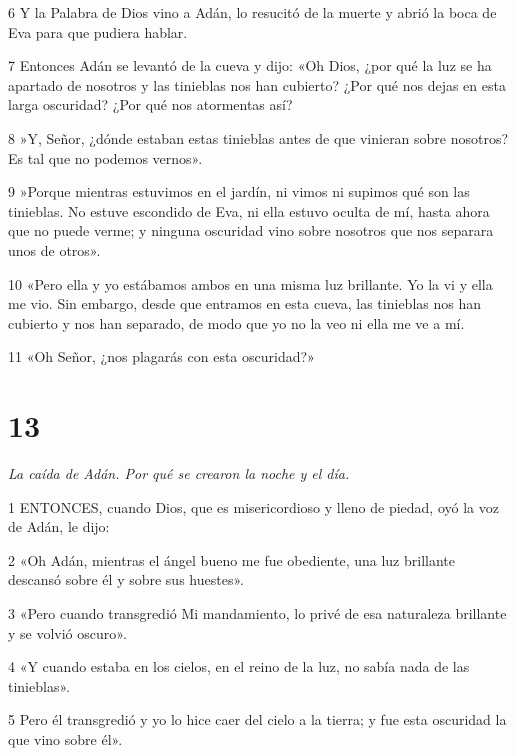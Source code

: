 \par 6 Y la Palabra de Dios vino a Adán, lo resucitó de la muerte y abrió la boca de Eva para que pudiera hablar.

\par 7 Entonces Adán se levantó de la cueva y dijo: «Oh Dios, ¿por qué la luz se ha apartado de nosotros y las tinieblas nos han cubierto? ¿Por qué nos dejas en esta larga oscuridad? ¿Por qué nos atormentas así?

\par 8 »Y, Señor, ¿dónde estaban estas tinieblas antes de que vinieran sobre nosotros? Es tal que no podemos vernos».

\par 9 »Porque mientras estuvimos en el jardín, ni vimos ni supimos qué son las tinieblas. No estuve escondido de Eva, ni ella estuvo oculta de mí, hasta ahora que no puede verme; y ninguna oscuridad vino sobre nosotros que nos separara unos de otros».

\par 10 «Pero ella y yo estábamos ambos en una misma luz brillante. Yo la vi y ella me vio. Sin embargo, desde que entramos en esta cueva, las tinieblas nos han cubierto y nos han separado, de modo que yo no la veo ni ella me ve a mí.

\par 11 «Oh Señor, ¿nos plagarás con esta oscuridad?»

\chapter{13}

\par \textit{La caída de Adán. Por qué se crearon la noche y el día.}

\par 1 ENTONCES, cuando Dios, que es misericordioso y lleno de piedad, oyó la voz de Adán, le dijo:

\par 2 «Oh Adán, mientras el ángel bueno me fue obediente, una luz brillante descansó sobre él y sobre sus huestes».

\par 3 «Pero cuando transgredió Mi mandamiento, lo privé de esa naturaleza brillante y se volvió oscuro».

\par 4 «Y cuando estaba en los cielos, en el reino de la luz, no sabía nada de las tinieblas».

\par 5 Pero él transgredió y yo lo hice caer del cielo a la tierra; y fue esta oscuridad la que vino sobre él».

